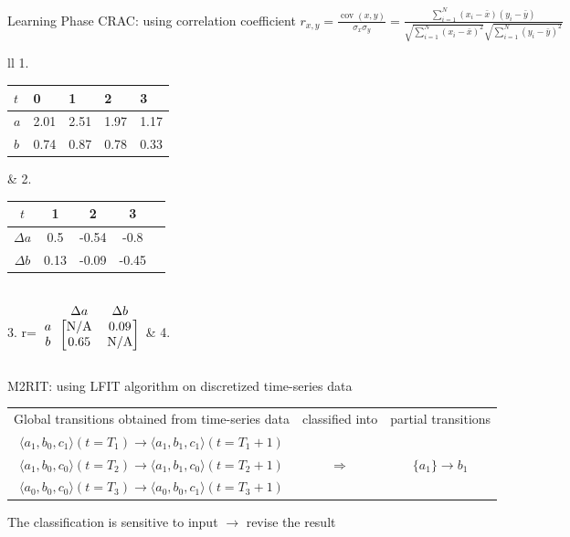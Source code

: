 \begin{frame}{Learning Phase}
CRAC: using correlation coefficient $r_{x,y}={\frac {\operatorname {cov} (x,y)}{\sigma _{x}\sigma _{y}}}$\pause$={\frac {\sum _{i=1}^{N}(x_{i}-{\bar {x}})(y_{i}-{\bar {y}})}{{\sqrt {\sum _{i=1}^{N}(x_{i}-{\bar {x}})^{2}}}{\sqrt {\sum _{i=1}^{N}(y_{i}-{\bar {y}})^{2}}}}}$

\pause
\vspace{0.2cm}
\begin{tabular}{ll}
1.\begin{tabular}{l|*{4}{l}}
$t$&0&1&2&3\\
\hline
$a$&2.01&2.51&1.97&1.17\\
$b$&0.74&0.87&0.78&0.33\\
\end{tabular}   
\pause
& 
2.
\begin{tabular}{c|c*{3}{S}}
$t$&1&2&3\\
\hline
$\Delta a$&0.5&-0.54&-0.8\\
$\Delta b$&0.13&-0.09&-0.45\\
\end{tabular}
\pause
\\
3.
r=$ 
\begin{blockarray}{ccc}
&\Delta a&\Delta b  \\
\begin{block}{c[cc]}
a&\text{N/A}&0.09\\
b&0.65&\text{N/A}\\
\end{block}
\end{blockarray}
$
\pause
&
4.
\end{tabular}

\vspace{1.2cm}
\pause

M2RIT: using LFIT algorithm on discretized time-series data

\vspace{0.2cm}
\begin{tabular}{ccc}
    Global transitions obtained from time-series data & classified into & partial transitions\\
    $\langle a_1,b_0,c_1\rangle(t=T_1)\to \langle a_1,b_1,c_1\rangle(t=T_1+1)$&&\\
    $\langle a_1,b_0,c_0\rangle(t=T_2)\to \langle a_1,b_1,c_0\rangle(t=T_2+1)$&$\Longrightarrow$&$\{a_1\}\to b_1$\\
    $\langle a_0,b_0,c_0\rangle(t=T_3)\to \langle a_0,b_0,c_1\rangle(t=T_3+1)$&&
\end{tabular}

\vspace{0.2cm}
\pause
The classification is sensitive to input $\to$ revise the result
\end{frame}